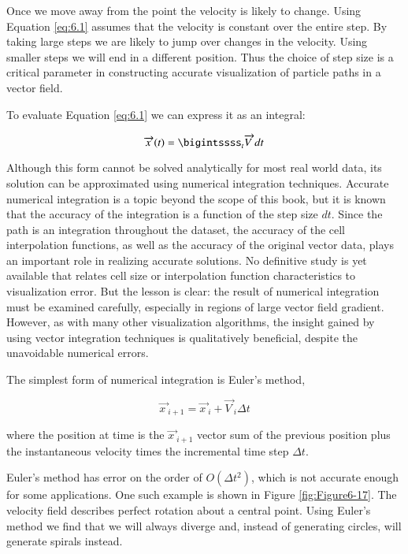 Once we move away from the point the velocity is likely to change. Using Equation \ref{eq:6.1} assumes that the velocity is constant over the entire step. By taking large steps we are likely to jump over changes in the velocity. Using smaller steps we will end in a different position. Thus the choice of step size is a critical parameter in constructing accurate visualization of particle paths in a vector field.

To evaluate Equation \ref{eq:6.1} we can express it as an integral:

\begin{equation}\label{eq:6.2}
\overrightarrow{x\ }(t) = \bigintssss_{t}\overrightarrow{V\ }dt
\end{equation}

Although this form cannot be solved analytically for most real world data, its solution can be approximated using numerical integration techniques. Accurate numerical integration is a topic beyond the scope of this book, but it is known that the accuracy of the integration is a function of the step size \emph{$dt$}. Since the path is an integration throughout the dataset, the accuracy of the cell interpolation functions, as well as the accuracy of the original vector data, plays an important role in realizing accurate solutions. No definitive study is yet available that relates cell size or interpolation function characteristics to visualization error. But the lesson is clear: the result of numerical integration must be examined carefully, especially in regions of large vector field gradient. However, as with many other visualization algorithms, the insight gained by using vector integration techniques is qualitatively beneficial, despite the unavoidable numerical errors.

The simplest form of numerical integration is Euler's method,

\begin{equation}\label{eq:6.3}
\overrightarrow{x\ }_{i+1} = \overrightarrow{x\ }_i + \overrightarrow{V\ }_i \Delta{t}
\end{equation}

where the position at time is the $\overrightarrow{x\ }_{i+1}$ vector sum of the previous position plus the instantaneous velocity times the incremental time step $\Delta{t}$.

Euler's method has error on the order of $O(\Delta{t}^2)$, which is not accurate enough for some applications. One such example is shown in Figure \ref{fig:Figure6-17}. The velocity field describes perfect rotation about a central point. Using Euler's method we find that we will always diverge and, instead of generating circles, will generate spirals instead.

